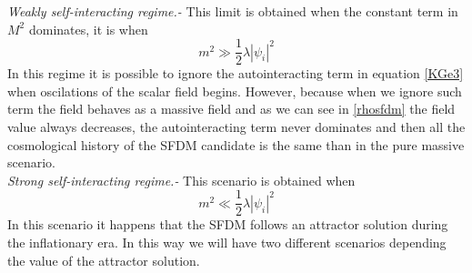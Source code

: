 \documentclass[amssymb,twocolumn,prd,nofootinbib,showpacs]{revtex4-1}
\begin{document}
\textit{Weakly self-interacting regime.-} This limit is obtained when the constant term in $M^2$ dominates, it is when
\begin{equation}\label{consw}
m^2\gg \frac{1}{2}\lambda|\psi_i|^2
\end{equation}
In this regime it is possible to ignore the autointeracting term in equation \eqref{KGe3} when oscilations of the scalar field begins. However, because when we ignore such term the field behaves as a massive field and as we can see in \eqref{rhosfdm} the field value always decreases, the autointeracting term never dominates and then all the cosmological history of the SFDM candidate is the same than in the pure massive scenario. 
\\

\textit{Strong self-interacting regime.-} This scenario is obtained when 
\begin{equation}
m^2\ll \frac{1}{2}\lambda|\psi_i|^2
\end{equation}
In this scenario it happens that the SFDM follows an attractor solution during the inflationary era. In this way we will have two different scenarios depending the value of the attractor solution.
\\
\end{document}
